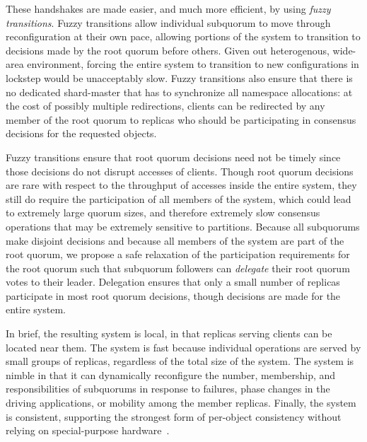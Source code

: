 These handshakes are made easier, and much more efficient, by using \emph{fuzzy transitions}.
Fuzzy transitions allow individual subquorum to move through reconfiguration at their own pace, allowing portions of the system to transition to decisions made by the root quorum before others.
Given out heterogenous, wide-area environment, forcing the entire system to transition to new configurations in lockstep would be unacceptably slow.
Fuzzy transitions also ensure that there is no dedicated shard-master that has to synchronize all namespace allocations: at the cost of possibly multiple  redirections, clients can be redirected by any member of the root quorum to replicas who should be participating in consensus decisions for the requested objects.

Fuzzy transitions ensure that root quorum decisions need not be timely since those decisions do not disrupt accesses of clients.
Though root quorum decisions are rare with respect to the throughput of accesses inside the entire system, they still do require the participation of all members of the system, which could lead to extremely large quorum sizes, and therefore extremely slow consensus operations that may be extremely sensitive to partitions.
Because all subquorums make disjoint decisions and because all members of the system are part of the root quorum, we propose a safe relaxation of the participation requirements for the root quorum such that subquorum followers can \emph{delegate} their root quorum votes to their leader.
Delegation ensures that only a small number of replicas participate in most root quorum decisions, though decisions are made for the entire system.

In brief, the resulting system is local, in that replicas serving clients can be located near them.
The system is fast because individual operations are served by small groups of replicas, regardless of the total size of the system.
The system is nimble in that it can dynamically reconfigure the number, membership, and responsibilities of subquorums in response to failures, phase changes in the driving applications, or mobility among the member replicas.
Finally, the system is consistent, supporting the strongest form of per-object consistency without relying on special-purpose hardware~\cite{fawn,corfu,vcorfu,tango,spanner}.

